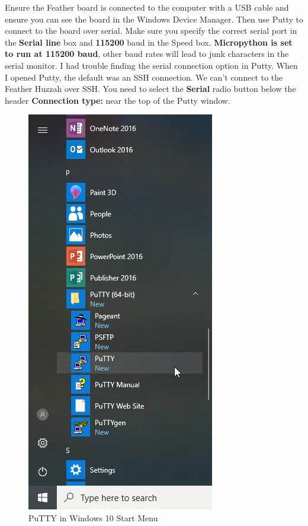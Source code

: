 \documentclass{book}
\makeatletter
\def\maxwidth{\ifdim\Gin@nat@width>\linewidth\linewidth
    \else\Gin@nat@width\fi}
\let\Oldincludegraphics\includegraphics
\renewcommand{\includegraphics}[1]{\Oldincludegraphics[width=.8\maxwidth]{#1}}
\makeatother
\begin{document}
    
        Ensure the Feather board is connected to the computer with a USB cable
and ensure you can see the board in the Windows Device Manager. Then use
Putty to connect to the board over serial. Make sure you specify the
correct serial port in the \textbf{Serial line} box and \textbf{115200}
baud in the Speed box. \textbf{Micropython is set to run at 115200
baud}, other baud rates will lead to junk characters in the serial
monitor. I had trouble finding the serial connection option in Putty.
When I opened Putty, the default was an SSH connection. We can't connect
to the Feather Huzzah over SSH. You need to select the \textbf{Serial}
radio button below the header \textbf{Connection type:} near the top of
the Putty window.

\begin{figure}
\centering
\includegraphics{images/putty_in_start_menu.png}
\caption{PuTTY in Windows 10 Start Menu}
\end{figure}
\end{document}
